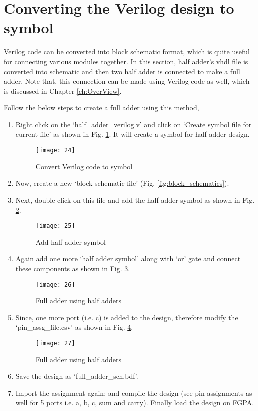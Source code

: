 \section{Converting the Verilog design to symbol} \label{sec:vhdl_to_symbol}
Verilog code can be converted into block schematic format,  which is quite useful for connecting various modules together. In this section, half adder's vhdl file is converted into schematic and then two half adder is connected to make a full adder. Note that, this connection can be made using Verilog code as well, which is discussed in Chapter \ref{ch:OverView}. 

Follow the below steps to create a full adder using this method,


\begin{enumerate}
	\item Right click on the `half\_adder\_verilog.v' and click on `Create symbol file for current file' as shown in Fig. \ref{fig:vhdl_to_symbol}. It will create a symbol for half adder design. 
	
	\begin{figure}
		\centering
		\texttt{[image: 24]}
		\caption{Convert Verilog code to symbol}
		\label{fig:vhdl_to_symbol}
	\end{figure}
	\item Now, create a new `block schematic file' (Fig. \ref{fig:block_schematics}). 
	\item Next, double click on this file and add the half adder symbol as shown in Fig. \ref{fig:ha_symbol}.
	
	\begin{figure}
		\centering
		\texttt{[image: 25]}
		\caption{Add half adder symbol}
		\label{fig:ha_symbol}
	\end{figure}
	\item Again add one more `half adder symbol' along with `or' gate and connect these components as shown in Fig. \ref{fig:fa_design}. 
	
	\begin{figure}
		\centering
		\texttt{[image: 26]}
		\caption{Full adder using half adders}
		\label{fig:fa_design}
	\end{figure}
	
	\item Since, one more port (i.e. c) is added to the design, therefore modify the `pin\_assg\_file.csv' as shown in Fig. \ref{fig:update_pin_assg}. 
	
	\begin{figure}
		\centering
		\texttt{[image: 27]}
		\caption{Full adder using half adders}
		\label{fig:update_pin_assg}
	\end{figure}
	\item Save the design as `full\_adder\_sch.bdf'. 
	\item Import the assignment again; and compile the design (see pin assignments as well for 5 ports i.e. a, b, c, sum and carry). Finally load the design on FGPA. 
\end{enumerate}

